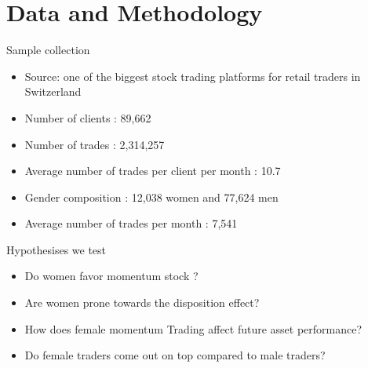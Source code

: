 \documentclass{beamer}
\begin{document}
\section{Data and Methodology}

\begin{frame}{Sample collection}

\begin{itemize}
	\item Source: one of the biggest stock trading platforms for retail traders in Switzerland
 \item Number of clients : 89,662

\item Number of trades :  2,314,257

\item Average number of trades per client per month : 10.7

\item Gender composition : 12,038 women and 77,624 men 

\item Average number of trades per month : 7,541 

\end{itemize}

\end{frame}


\begin{frame}{Hypothesises we test}

\begin{itemize}

	\item Do women favor momentum stock ?

	\item Are women prone towards the disposition effect?
	
	\item How does female momentum Trading affect future asset performance?
	
	\item Do female traders come out on top compared to male traders?

\end{itemize}
\end{frame}
\end{document}
